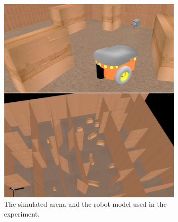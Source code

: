 \documentclass[a4paper,12pt,oneside,openright]{bhamthesis}
\begin{document}
\begin{figure}
	\centering
	\begin{subfigure}[b]{0.45\textwidth}
		\centering
		\includegraphics[width=\textwidth]{chapter4_fig/sim2.jpeg}
		\caption{The simulated arena and the robot model used in the experiment.}
		\label{subfig:arena_exp2}
	\end{subfigure}
	\hfill
	\begin{subfigure}[b]{0.35\textwidth}
		\centering

\end{subfigure}
\end{figure}
\end{document}
